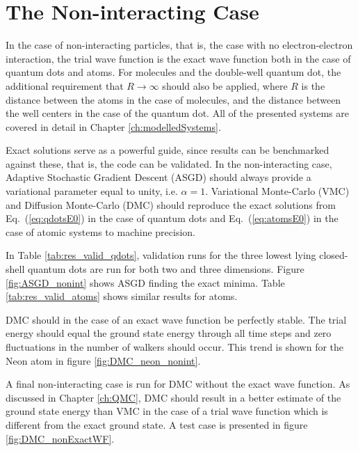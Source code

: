 \section{The Non-interacting Case}

In the case of non-interacting particles, that is, the case with no electron-electron interaction, the trial wave function is the exact wave function both in the case of quantum dots and atoms. For molecules and the double-well quantum dot, the additional requirement that $R\to\infty$ should also be applied, where $R$ is the distance between the atoms in the case of molecules, and the distance between the well centers in the case of the quantum dot. All of the presented systems are covered in detail in Chapter \ref{ch:modelledSystems}.

Exact solutions serve as a powerful guide, since results can be benchmarked against these, that is, the code can be validated. In the non-interacting case, Adaptive Stochastic Gradient Descent (ASGD) should always provide a variational parameter equal to unity, i.e. $\alpha=1$. Variational Monte-Carlo (VMC) and Diffusion Monte-Carlo (DMC) should reproduce the exact solutions from Eq.~(\ref{eq:qdotsE0}) in the case of quantum dots and Eq.~(\ref{eq:atomsE0}) in the case of atomic systems to machine precision. 

In Table \ref{tab:res_valid_qdots}, validation runs for the three lowest lying closed-shell quantum dots are run for both two and three dimensions. Figure \ref{fig:ASGD_nonint} shows ASGD finding the exact minima. Table \ref{tab:res_valid_atoms} shows similar results for atoms.

DMC should in the case of an exact wave function be perfectly stable. The trial energy should equal the ground state energy through all time steps and zero fluctuations in the number of walkers should occur. This trend is shown for the Neon atom in figure \ref{fig:DMC_neon_nonint}.

A final non-interacting case is run for DMC without the exact wave function. As discussed in Chapter \ref{ch:QMC}, DMC should result in a better estimate of the ground state energy than VMC in the case of a trial wave function which is different from the exact ground state. A test case is presented in figure \ref{fig:DMC_nonExactWF}.

